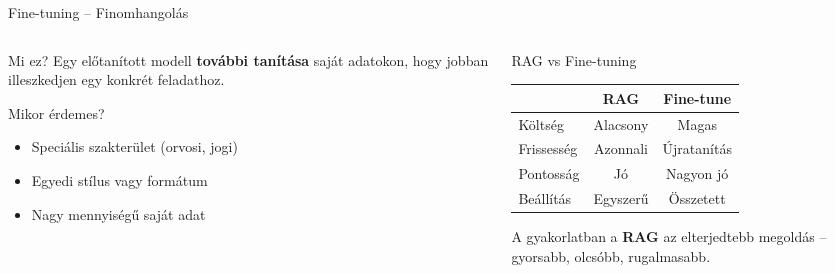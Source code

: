 \documentclass[aspectratio=169, 12pt]{beamer}
\begin{document}
\begin{frame}{Fine-tuning -- Finomhangolás}
  \footnotesize
  \begin{columns}[T,onlytextwidth]
    \begin{column}{0.47\textwidth}
      \begin{block}{Mi ez?}
        Egy előtanított modell \textbf{további tanítása} saját adatokon, hogy jobban illeszkedjen egy konkrét feladathoz.
      \end{block}

      \vspace{0.3cm}

      \begin{exampleblock}{Mikor érdemes?}
        \begin{itemize}\setlength{\itemsep}{1pt}
          \item Speciális szakterület (orvosi, jogi)
          \item Egyedi stílus vagy formátum
          \item Nagy mennyiségű saját adat
        \end{itemize}
      \end{exampleblock}
    \end{column}
    \begin{column}{0.47\textwidth}
      \begin{alertblock}{RAG vs Fine-tuning}
        \begin{tabular}{lcc}
          & \textbf{RAG} & \textbf{Fine-tune} \\
          \midrule
          Költség & Alacsony & Magas \\
          Frissesség & Azonnali & Újratanítás \\
          Pontosság & Jó & Nagyon jó \\
          Beállítás & Egyszerű & Összetett \\
        \end{tabular}
      \end{alertblock}

      \vspace{0.3cm}

      {\small A gyakorlatban a \textbf{RAG} az elterjedtebb megoldás -- gyorsabb, olcsóbb, rugalmasabb.}
    \end{column}
  \end{columns}
\end{frame}

\end{document}
